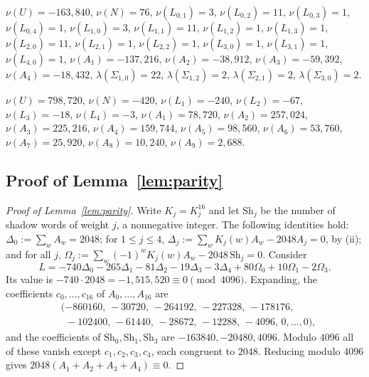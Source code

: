 \documentclass[11pt]{article}
\theoremstyle{definition}
\theoremstyle{remark}
\newcommand{\Sh}{\mathrm{Sh}}
\begin{document}
{\begin{description}[leftmargin=1.5em,style=nextline]
\item[(c), \(S\ni Z^5\), \(A_1=\cdots=A_4=0\)] \mbox{\(\nu(U)=-163{,}840\)}, \mbox{\(\nu(N)=76\)}, \mbox{\(\nu(L_{0,1})=3\)}, \mbox{\(\nu(L_{0,2})=11\)}, \mbox{\(\nu(L_{0,3})=1\)}, \mbox{\(\nu(L_{0,4})=1\)}, \mbox{\(\nu(L_{1,0})=3\)}, \mbox{\(\nu(L_{1,1})=11\)}, \mbox{\(\nu(L_{1,2})=1\)}, \mbox{\(\nu(L_{1,3})=1\)}, \mbox{\(\nu(L_{2,0})=11\)}, \mbox{\(\nu(L_{2,1})=1\)}, \mbox{\(\nu(L_{2,2})=1\)}, \mbox{\(\nu(L_{3,0})=1\)}, \mbox{\(\nu(L_{3,1})=1\)}, \mbox{\(\nu(L_{4,0})=1\)}, \mbox{\(\nu(A_{1})=-137{,}216\)}, \mbox{\(\nu(A_{2})=-38{,}912\)}, \mbox{\(\nu(A_{3})=-59{,}392\)}, \mbox{\(\nu(A_{4})=-18{,}432\)}, \mbox{\(\lambda(\Sigma_{1,0})=22\)}, \mbox{\(\lambda(\Sigma_{1,2})=2\)}, \mbox{\(\lambda(\Sigma_{2,1})=2\)}, \mbox{\(\lambda(\Sigma_{3,0})=2\)}.
\item[(d), \(A_1=\cdots=A_9=0\)] \mbox{\(\nu(U)=798{,}720\)}, \mbox{\(\nu(N)=-420\)}, \mbox{\(\nu(L_{1})=-240\)}, \mbox{\(\nu(L_{2})=-67\)}, \mbox{\(\nu(L_{3})=-18\)}, \mbox{\(\nu(L_{4})=-3\)}, \mbox{\(\nu(A_{1})=78{,}720\)}, \mbox{\(\nu(A_{2})=257{,}024\)}, \mbox{\(\nu(A_{3})=225{,}216\)}, \mbox{\(\nu(A_{4})=159{,}744\)}, \mbox{\(\nu(A_{5})=98{,}560\)}, \mbox{\(\nu(A_{6})=53{,}760\)}, \mbox{\(\nu(A_{7})=25{,}920\)}, \mbox{\(\nu(A_{8})=10{,}240\)}, \mbox{\(\nu(A_{9})=2{,}688\)}.
\end{description}\par}

\subsection{Proof of Lemma~\ref{lem:parity}}

\begin{proof}[Proof of Lemma~\ref{lem:parity}]
Write \(K_j=K^{16}_j\) and let \(\Sh_j\) be the number of shadow words of
weight \(j\), a nonnegative integer. The following identities hold:
\(\Delta_0:=\sum_wA_w=2048\); for \(1\leq j\leq 4\),
\(\Delta_j:=\sum_wK_j(w)A_w-2048A_j=0\), by (ii); and for all \(j\),
\(\Omega_j:=\sum_w(-1)^wK_j(w)A_w-2048\,\Sh_j=0\). Consider
\[
 L=-740\Delta_0-265\Delta_1-81\Delta_2-19\Delta_3-3\Delta_4
   +80\Omega_0+10\Omega_1-2\Omega_3 .
\]
Its value is \(-740\cdot2048=-1{,}515{,}520\equiv0\pmod{4096}\). Expanding,
the coefficients \(c_0,\ldots,c_{16}\) of \(A_0,\ldots,A_{16}\) are
\[
 \begin{aligned}
 &(-860160,\,-30720,\,-264192,\,-227328,\,-178176,\\
 &\ \ -102400,\,-61440,\,-28672,\,-12288,\,-4096,\,0,\ldots,0),
 \end{aligned}
\]
and the coefficients of \(\Sh_0,\Sh_1,\Sh_3\) are
\(-163840,-20480,4096\). Modulo \(4096\) all of these vanish except
\(c_1,c_2,c_3,c_4\), each congruent to \(2048\). Reducing modulo \(4096\)
gives \(2048(A_1+A_2+A_3+A_4)\equiv0\).
\end{proof}
\end{document}
